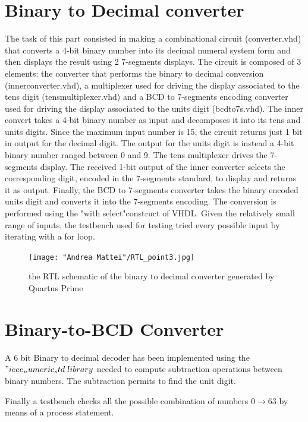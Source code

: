 \documentclass[12pt]{article}
\begin{document}
\section{ Binary to Decimal converter}
The task of this part consisted in making a combinational circuit (converter.vhd) that converts a 4-bit binary number into its decimal numeral system form and then displays the result using 2 7-segments displays. The circuit is composed of 3 elements: the converter that performs the binary to decimal conversion (inner\textunderscore converter.vhd), a multiplexer used for driving the display associated to the tens digit (tens\textunderscore multiplexer.vhd) and a BCD to 7-segments encoding converter used for driving the display associated to the units digit (bcd\textunderscore to\textunderscore 7s.vhd). \newline
The inner convert takes a 4-bit binary number as input and decomposes it into its tens and units digits. Since the maximum input number is 15, the circuit returns just 1 bit in output for the decimal digit. The output for the units digit is instead a 4-bit binary number ranged between 0 and 9. \newline
The tens multiplexer drives the 7-segments display. The received 1-bit output of the inner converter selects the corresponding digit, encoded in the 7-segments standard, to display and returns it as output. \newline
Finally, the BCD to 7-segments converter takes the binary encoded units digit and converts it into the 7-segments encoding. The conversion is performed using the "with select"construct of VHDL. \newline
Given the relatively small range of inputs, the testbench used for testing tried every possible input by iterating with a for loop.
\begin{figure}[h]
	\centering
	\texttt{[image: "Andrea Mattei"/RTL\_point3.jpg]}
	\caption{the RTL schematic of the binary to decimal converter generated by Quartus Prime}
\end{figure}
\section{ Binary-to-BCD Converter}
A 6 bit Binary to decimal decoder has been implemented using the $"ieee_numeric_std \; library$ needed to compute subtraction operations between  binary numbers.\newline
The subtraction permits to find the unit digit.

Finally a testbench checks all the possible combination of numbers $0\to63$ by means of a process statement.
\end{document}
